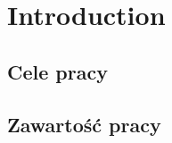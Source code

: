 \chapter{Introduction}
\label{chapter:intro}

\section{Cele pracy}
\label{sec:celePracy}

\section{Zawartość pracy}
\label{sec:zawartoscPracy}


















